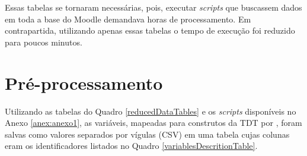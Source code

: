 
Essas tabelas se tornaram necessárias, pois, executar \textit{scripts} que
buscassem dados em toda a base do Moodle demandava horas de processamento. Em
contrapartida, utilizando apenas essas tabelas o tempo de execução foi reduzido
para poucos minutos.

\section{Pré-processamento}

Utilizando as tabelas do Quadro \ref{reducedDataTables} e os \textit{scripts}
disponíveis no Anexo \ref{anex:anexo1}, as variáveis, mapeadas para construtos
da TDT por , foram salvas como valores separados
por vígulas (CSV) em uma tabela cujas colunas eram os identificadores listados
no Quadro \ref{variablesDescritionTable}.

